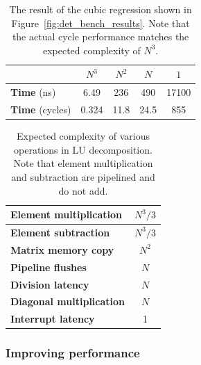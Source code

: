 \documentclass[]{article}
\begin{document}
\begin{table}[htbp]
	\caption{The result of the cubic regression shown in Figure~\ref{fig:det_bench_results}. Note that the actual cycle performance matches the expected complexity of $N^3$.}
	\label{tab:polyfit_coeffs}
	\begin{center}
		\begin{tabular}{l|cccc}
		\hline

		\hline
			& \textbf{$N^3$} & \textbf{$N^2$} & \textbf{$N$} & \textbf{$1$}\\
		\hline
			\textbf{Time} (ns)
			& 6.49 	& 236	& 490	& 17100 \\
			\textbf{Time} (cycles)
			& 0.324 & 11.8 	& 24.5 	& 855 \\
		\hline

		\hline
		\end{tabular}
	\end{center}
\end{table}



\begin{table}[htbp]
	\caption{Expected complexity of various operations in LU decomposition. Note that element multiplication and subtraction are pipelined and do not add.}
	\label{tab:expected_complexity}
	\begin{center}
		\begin{tabular}{l|c}
		\hline

		\hline
			\textbf{Element multiplication} 	& $N^3/3$ \\
		\hline
			\textbf{Element subtraction} 		& $N^3/3$ \\
		\hline
			\textbf{Matrix memory copy} 		& $N^2$ \\
		\hline
			\textbf{Pipeline flushes} 			& $N$ \\
		\hline
			\textbf{Division latency} 			& $N$ \\
		\hline
			\textbf{Diagonal multiplication} 	& $N$ \\
		\hline
			\textbf{Interrupt latency}			& 1 \\
		\hline
		
		\hline
		\end{tabular}
	\end{center}
\end{table}


\subsubsection{Improving performance} %
\label{sub:improving_performance}
\end{document}
